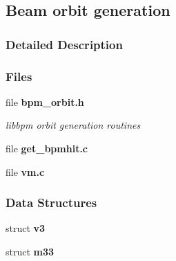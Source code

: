 \subsection{Beam orbit generation}
\label{group__orbit}


\subsubsection{Detailed Description}


\subsubsection*{Files}
\begin{CompactItemize}
\item 
file {\bf bpm\_\-orbit.h}
\begin{CompactList}\small\item\em libbpm orbit generation routines \item\end{CompactList}

\item 
file {\bf get\_\-bpmhit.c}
\item 
file {\bf vm.c}
\end{CompactItemize}
\subsubsection*{Data Structures}
\begin{CompactItemize}
\item 
struct {\bf v3}
\item 
struct {\bf m33}
\end{CompactItemize}
